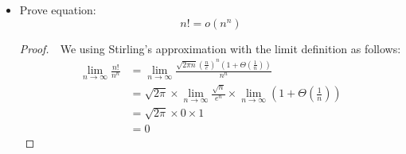 \documentclass{article}
\begin{document}
\begin{itemize}
\begin{proof}
        $ $\newline
        $ $\newline
        We using Stirling's approximation with the limit definition as follows:
        \begin{equation}
            \begin{aligned}
            \lim _{n \rightarrow \infty} \frac{n !}{2^n} & =\lim _{n \rightarrow \infty} \frac{\sqrt{2 \pi n}\left(\frac{n}{e}\right)^n\left(1+\Theta\left(\frac{1}{n}\right)\right)}{2^n} \\
            & =\sqrt{2 \pi} \times \lim _{n \rightarrow \infty} \sqrt{n}\left(\frac{n}{2 e}\right)^n \times \lim _{n \rightarrow \infty}\left(1+\Theta\left(\frac{1}{n}\right)\right) \\
            & =\sqrt{2 \pi} \times \infty \times 1 \\
            & =\infty
            \end{aligned}
        \end{equation}
    \end{proof}
    \item Prove equation: \begin{equation} n! = o(n^n) \end{equation}
    \begin{proof}
        $ $\newline
        $ $\newline
        We using Stirling's approximation with the limit definition as follows:
        \begin{equation}
            \begin{aligned}
            \lim _{n \rightarrow \infty} \frac{n !}{n^n} & =\lim _{n \rightarrow \infty} \frac{\sqrt{2 \pi n}\left(\frac{n}{e}\right)^n\left(1+\Theta\left(\frac{1}{n}\right)\right)}{n^n} \\
            & =\sqrt{2 \pi} \times \lim _{n \rightarrow \infty} \frac{\sqrt{n}}{e^n} \times \lim _{n \rightarrow \infty}\left(1+\Theta\left(\frac{1}{n}\right)\right) \\
            & =\sqrt{2 \pi} \times 0 \times 1 \\
            & =0
            \end{aligned}
        \end{equation}
    \end{proof}
\end{itemize}
\end{document}

